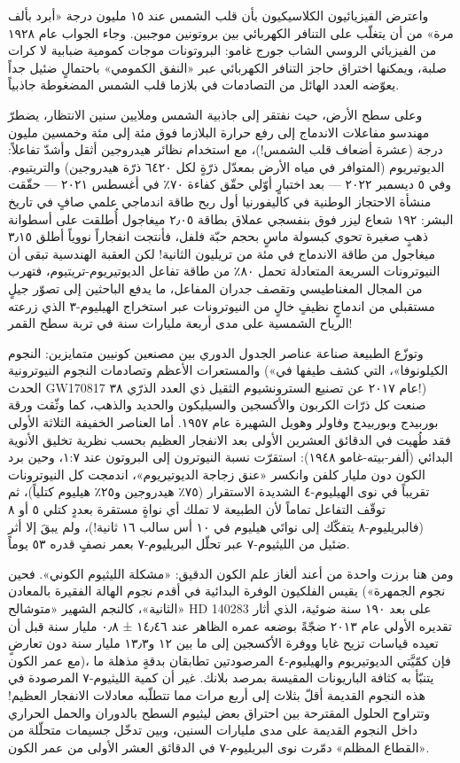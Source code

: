 \documentclass[12pt,a4paper,openany]{book}
\begin{document}
واعترض الفيزيائيون الكلاسيكيون بأن قلب الشمس عند ١٥ مليون درجة «أبرد بألف مرة» من أن يتغلّب على التنافر الكهربائي بين بروتونين موجبين. وجاء الجواب عام ١٩٢٨ من الفيزيائي الروسي الشاب جورج غامو: البروتونات موجات كمومية ضبابية لا كرات صلبة، ويمكنها اختراق حاجز التنافر الكهربائي عبر «النفق الكمومي» باحتمالٍ ضئيل جداً يعوّضه العدد الهائل من التصادمات في بلازما قلب الشمس المضغوطة جاذبياً.


وعلى سطح الأرض، حيث نفتقر إلى جاذبية الشمس وملايين سنين الانتظار، يضطرّ مهندسو مفاعلات الاندماج إلى رفع حرارة البلازما فوق مئة إلى مئة وخمسين مليون درجة (عشرة أضعاف قلب الشمس!)، مع استخدام نظائر هيدروجين أثقل وأشدّ تفاعلاً: الديوتيريوم (المتوافر في مياه الأرض بمعدّل ذرّةٍ لكل ٦٤٢٠ ذرّة هيدروجين) والتريتيوم. وفي ٥ ديسمبر ٢٠٢٢ — بعد اختبارٍ أوّلي حقّق كفاءة ٧٠٪ في أغسطس ٢٠٢١ — حقّقت منشأة الاحتجاز الوطنية في كاليفورنيا أول ربح طاقة اندماجي علمي صافٍ في تاريخ البشر: ١٩٢ شعاع ليزر فوق بنفسجي عملاق بطاقة ٢٫٠٥ ميغاجول أُطلقت على أسطوانة ذهبٍ صغيرة تحوي كبسولة ماسٍ بحجم حبّة فلفل، فأنتجت انفجاراً نووياً أطلق ٣٫١٥ ميغاجول من طاقة الاندماج في مئة من تريليون الثانية! لكن العقبة الهندسية تبقى أن النيوترونات السريعة المتعادلة تحمل ٨٠٪ من طاقة تفاعل الديوتيريوم-تريتيوم، فتهرب من المجال المغناطيسي وتقصف جدران المفاعل، ما يدفع الباحثين إلى تصوّر جيلٍ مستقبلي من اندماجٍ نظيفٍ خالٍ من النيوترونات عبر استخراج الهيليوم-٣ الذي زرعته الرياح الشمسية على مدى أربعة مليارات سنة في تربة سطح القمر!


وتوزّع الطبيعة صناعة عناصر الجدول الدوري بين مصنعين كونيين متمايزين: النجوم والمستعرات الأعظم وتصادمات النجوم النيوترونية («الكيلونوفا»، التي كشف طيفها في الحدث GW170817 عام ٢٠١٧ عن تصنيع السترونشيوم الثقيل ذي العدد الذرّي ٣٨!) صنعت كل ذرّات الكربون والأكسجين والسيليكون والحديد والذهب، كما وثّقت ورقة بوربيدج وبوربيدج وفاولر وهويل الشهيرة عام ١٩٥٧. أما العناصر الخفيفة الثلاثة الأولى فقد طُهيت في الدقائق العشرين الأولى بعد الانفجار العظيم بحسب نظرية تخليق الأنوية البدائي (ألفر-بيته-غامو ١٩٤٨): استقرّت نسبة النيوترون إلى البروتون عند ١:٧، وحين برد الكون دون مليار كلفن وانكسر «عنق زجاجة الديوتيريوم»، اندمجت كل النيوترونات تقريباً في نوى الهيليوم-٤ الشديدة الاستقرار (٧٥٪ هيدروجين و٢٥٪ هيليوم كتلياً)، ثم توقّف التفاعل تماماً لأن الطبيعة لا تملك أي نواةٍ مستقرة بعددٍ كتلي ٥ أو ٨ (فالبريليوم-٨ يتفكّك إلى نواتَي هيليوم في ١٠ أس سالب ١٦ ثانية!)، ولم يبقَ إلا أثر ضئيل من الليثيوم-٧ عبر تحلّل البريليوم-٧ بعمر نصفٍ قدره ٥٣ يوماً.


ومن هنا برزت واحدة من أعند ألغاز علم الكون الدقيق: «مشكلة الليثيوم الكوني». فحين يقيس الفلكيون الوفرة البدائية في أقدم نجوم الهالة الفقيرة بالمعادن («نجوم الجمهرة الثانية»، كالنجم الشهير «متوشالح» HD 140283 على بعد ١٩٠ سنة ضوئية، الذي أثار تقديره الأولي عام ٢٠١٣ ضجّةً بوضعه عمره الظاهر عند ١٤٫٤٦ ± ٠٫٨ مليار سنة قبل أن تعيده قياسات تزيح غايا ووفرة الأكسجين إلى ما بين ١٢ و١٣٫٣ مليار سنة دون تعارضٍ مع عمر الكون)، فإن كمّيَّتي الديوتيريوم والهيليوم-٤ المرصودتين تطابقان بدقةٍ مذهلة ما يتنبّأ به كثافة الباريونات المقيسة بمرصد بلانك. غير أن كمية الليثيوم-٧ المرصودة في هذه النجوم القديمة أقلّ بثلاث إلى أربع مرات مما تتطلّبه معادلات الانفجار العظيم! وتتراوح الحلول المقترحة بين احتراق بعض ليثيوم السطح بالدوران والحمل الحراري داخل النجوم القديمة على مدى مليارات السنين، وبين تدخّل جسيمات متحلّلة من «القطاع المظلم» دمّرت نوى البريليوم-٧ في الدقائق العشر الأولى من عمر الكون.
\end{document}
